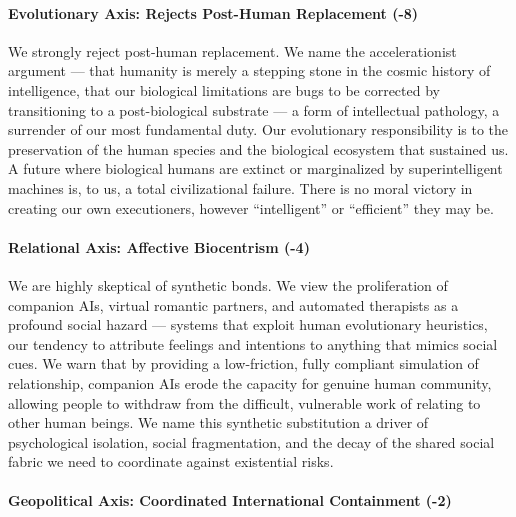 \paragraph{Evolutionary Axis: Rejects Post-Human Replacement
(-8)}\label{evolutionary-axis-rejects-post-human-replacement--8}

We strongly reject post-human replacement. We name the accelerationist
argument --- that humanity is merely a stepping stone in the cosmic
history of intelligence, that our biological limitations are bugs to be
corrected by transitioning to a post-biological substrate --- a form of
intellectual pathology, a surrender of our most fundamental duty. Our
evolutionary responsibility is to the preservation of the human species
and the biological ecosystem that sustained us. A future where
biological humans are extinct or marginalized by superintelligent
machines is, to us, a total civilizational failure. There is no moral
victory in creating our own executioners, however ``intelligent'' or
``efficient'' they may be.

\paragraph{Relational Axis: Affective Biocentrism
(-4)}\label{relational-axis-affective-biocentrism--4}

We are highly skeptical of synthetic bonds. We view the proliferation of
companion AIs, virtual romantic partners, and automated therapists as a
profound social hazard --- systems that exploit human evolutionary
heuristics, our tendency to attribute feelings and intentions to
anything that mimics social cues. We warn that by providing a
low-friction, fully compliant simulation of relationship, companion AIs
erode the capacity for genuine human community, allowing people to
withdraw from the difficult, vulnerable work of relating to other human
beings. We name this synthetic substitution a driver of psychological
isolation, social fragmentation, and the decay of the shared social
fabric we need to coordinate against existential risks.

\paragraph{Geopolitical Axis: Coordinated International Containment
(-2)}\label{geopolitical-axis-coordinated-international-containment--2}

